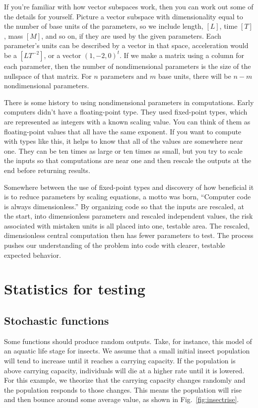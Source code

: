 \documentclass[fleqn,10pt]{olplainarticle}
\begin{document}
If you're familiar with how vector subspaces work, then
you can work out some of the details for yourself.
Picture a vector subspace with dimensionality equal to the
number of base units of the parameters, so we include
length, $[L]$, time $[T]$, mass $[M]$, and so on, if they are used
by the given parameters. Each parameter's units can be described
by a vector in that space, acceleration would be a $[LT^{-2}]$, or
a vector $(1, -2, 0)^t$. If we make a matrix using a column
for each parameter, then the number of nondimensional parameters
is the size of the nullspace of that matrix. For $n$ parameters
and $m$ base units, there will be $n-m$ nondimensional parameters.

There is some history to using nondimensional parameters in
computations. Early computers didn't have a floating-point type.
They used fixed-point types, which are represented as integers
with a known scaling value. You can think of them as floating-point
values that all have the same exponent. If you want to compute
with types like this, it helps to know that all of the values
are somewhere near one. They can be ten times as large or ten
times as small, but you try to scale the inputs so that
computations are near one and then rescale the outputs at
the end before returning results.

Somewhere between the use of fixed-point types and discovery
of how beneficial it is to reduce parameters by scaling
equations, a motto was born, ``Computer code is always
dimensionless.'' By organizing code so that the inputs are
rescaled, at the start, into dimensionless parameters and
rescaled independent values, the risk associated with
mistaken units is all placed into one, testable area.
The rescaled, dimensionless central computation then has
fewer parameters to test. The process pushes our understanding
of the problem into code with clearer, testable expected
behavior.


\section{Statistics for testing}\label{sec:statistical}

\subsection{Stochastic functions}

Some functions should produce random outputs. Take, for instance,
this model of an aquatic life stage for insects. We assume that
a small initial insect population will tend to increase until
it reaches a carrying capacity. If the population is above carrying
capacity, individuals will die at a higher rate until it is lowered.
For this example, we theorize that the carrying capacity changes
randomly and the population responds to those changes. This
means the population will rise and then bounce around
some average value, as shown in Fig.~\ref{fig:insectrise}.
\end{document}
